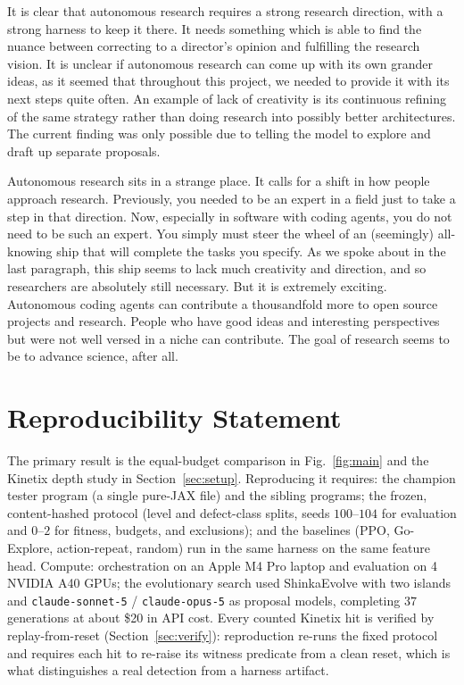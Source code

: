 \documentclass{article}
\begin{document}
It is clear that autonomous research requires a strong research direction, with a strong harness to keep it there. It needs
something which is able to find the nuance between correcting to a director's opinion and fulfilling the research vision. It
is unclear if autonomous research can come up with its own grander ideas, as it seemed that throughout this project, we
needed to provide it with its next steps quite often. An example of lack of creativity is its continuous refining of the
same strategy rather than doing research into possibly better architectures. The current finding was only possible due to
telling the model to explore and draft up separate proposals.

Autonomous research sits in a strange place. It calls for a shift in how people approach research. Previously, you needed to
be an expert in a field just to take a step in that direction. Now, especially in software with coding agents, you do not
need to be such an expert. You simply must steer the wheel of an (seemingly) all-knowing ship that will complete the tasks
you specify. As we spoke about in the last paragraph, this ship seems to lack much creativity and direction, and so
researchers are absolutely still necessary. But it is extremely exciting. Autonomous coding agents can contribute a
thousandfold more to open source projects and research. People who have good ideas and interesting perspectives but were
not well versed in a niche can contribute. The goal of research seems to be to advance science, after all.

\clearpage
\appendix

\section{Reproducibility Statement}
The primary result is the equal-budget comparison in Fig.~\ref{fig:main} and the Kinetix depth study in
Section~\ref{sec:setup}. Reproducing it requires: the champion tester program (a single pure-JAX file) and the sibling
programs; the frozen, content-hashed protocol (level and defect-class splits, seeds $100$--$104$ for evaluation and
$0$--$2$ for fitness, budgets, and exclusions); and the baselines (PPO, Go-Explore, action-repeat, random) run in the same
harness on the same feature head. Compute: orchestration on an Apple M4 Pro laptop and evaluation on 4 NVIDIA A40 GPUs; the
evolutionary search used ShinkaEvolve with two islands and \texttt{claude-sonnet-5} / \texttt{claude-opus-5} as proposal
models, completing $37$ generations at about \$20 in API cost. Every counted Kinetix hit is verified by replay-from-reset
(Section~\ref{sec:verify}): reproduction re-runs the fixed protocol and requires each hit to re-raise its witness predicate
from a clean reset, which is what distinguishes a real detection from a harness artifact.
\end{document}
